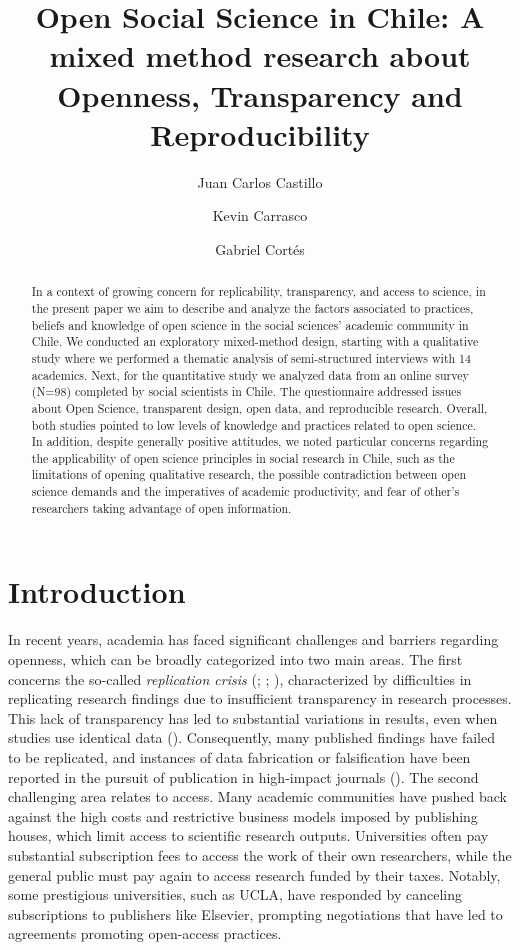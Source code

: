 \documentclass[
  english,
  letterpaper,
]{article}
\title{Open Social Science in Chile: A mixed method research about
Openness, Transparency and Reproducibility}
\author{Juan Carlos Castillo \and Kevin Carrasco \and Gabriel Cortés}
\date{}
\begin{document}
\maketitle
\begin{abstract}
In a context of growing concern for replicability, transparency, and
access to science, in the present paper we aim to describe and analyze
the factors associated to practices, beliefs and knowledge of open
science in the social sciences' academic community in Chile. We
conducted an exploratory mixed-method design, starting with a
qualitative study where we performed a thematic analysis of
semi-structured interviews with 14 academics. Next, for the quantitative
study we analyzed data from an online survey (N=98) completed by social
scientists in Chile. The questionnaire addressed issues about Open
Science, transparent design, open data, and reproducible research.
Overall, both studies pointed to low levels of knowledge and practices
related to open science. In addition, despite generally positive
attitudes, we noted particular concerns regarding the applicability of
open science principles in social research in Chile, such as the
limitations of opening qualitative research, the possible contradiction
between open science demands and the imperatives of academic
productivity, and fear of other's researchers taking advantage of open
information.
\end{abstract}


\section{Introduction}\label{introduction}

In recent years, academia has faced significant challenges and barriers
regarding openness, which can be broadly categorized into two main
areas. The first concerns the so-called \emph{replication crisis}
(;
;
), characterized by
difficulties in replicating research findings due to insufficient
transparency in research processes. This lack of transparency has led to
substantial variations in results, even when studies use identical data
(). Consequently, many
published findings have failed to be replicated, and instances of data
fabrication or falsification have been reported in the pursuit of
publication in high-impact journals
(). The
second challenging area relates to access. Many academic communities
have pushed back against the high costs and restrictive business models
imposed by publishing houses, which limit access to scientific research
outputs. Universities often pay substantial subscription fees to access
the work of their own researchers, while the general public must pay
again to access research funded by their taxes. Notably, some
prestigious universities, such as UCLA, have responded by canceling
subscriptions to publishers like Elsevier, prompting negotiations that
have led to agreements promoting open-access practices.
\end{document}
